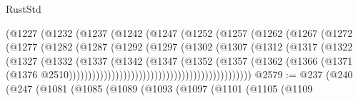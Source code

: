 \begin{lexlean}{RustStd}
\begin{coremodule}
                                    (@1227
                                      (@1232
                                        (@1237
                                          (@1242
                                            (@1247
                                              (@1252
                                                (@1257
                                                  (@1262
                                                    (@1267
                                                      (@1272
                                                        (@1277
                                                          (@1282
                                                            (@1287
                                                              (@1292
                                                                (@1297
                                                                  (@1302
                                                                    (@1307
                                                                      (@1312
                                                                        (@1317
                                                                          (@1322
                                                                            (@1327
                                                                              (@1332
                                                                                (@1337
                                                                                  (@1342
                                                                                    (@1347
                                                                                      (@1352
                                                                                        (@1357
                                                                                          (@1362
                                                                                            (@1366
                                                                                              (@1371
                                                                                                (@1376
                                                                                                  @2510)))))))))))))))))))))))))))))))))))))))))))))))
@2579 := @237
    (@240
      (@247
        (@1081
          (@1085
            (@1089
              (@1093
                (@1097
                  (@1101
                    (@1105
                      (@1109

\end{coremodule}
\end{lexlean}
